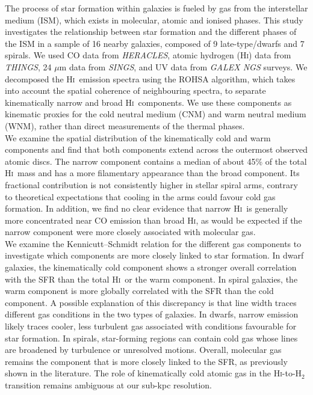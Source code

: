 \documentclass[12pt]{article}
\newcommand{\HI}{\textrm{H\textsc{i}}}
\begin{document}
The process of star formation within galaxies is fueled by gas from the interstellar medium (ISM), which exists in molecular, atomic and ionised phases. This study investigates the relationship between star formation and the different phases of the ISM in a sample of 16 nearby galaxies, composed of 9 late-type/dwarfs and 7 spirals.
We used CO data from \textit{HERACLES}, atomic hydrogen (\HI) data from \textit{THINGS}, 24 $\mu$m data from \textit{SINGS}, and UV data from \textit{GALEX NGS} surveys. We decomposed the \HI\ emission spectra using the ROHSA algorithm, which takes into account the spatial coherence of neighbouring spectra, to separate kinematically narrow and broad \HI\ components. We use these components as kinematic proxies for the cold neutral medium (CNM) and warm neutral medium (WNM), rather than direct measurements of the thermal phases.\\
We examine the spatial distribution of the kinematically cold and warm components and find that both components extend across the outermost observed atomic discs. The narrow component contains a median of about 45\% of the total \HI\ mass and has a more filamentary appearance than the broad component. Its fractional contribution is not consistently higher in stellar spiral arms, contrary to theoretical expectations that cooling in the arms could favour cold gas formation. In addition, we find no clear evidence that narrow \HI\ is generally more concentrated near CO emission than broad \HI, as would be expected if the narrow component were more closely associated with molecular gas.\\
We examine the Kennicutt--Schmidt relation for the different gas components to investigate which components are more closely linked to star formation. In dwarf galaxies, the kinematically cold component shows a stronger overall correlation with the SFR than the total \HI\ or the warm component. In spiral galaxies, the warm component is more globally correlated with the SFR than the cold component. A possible explanation of this discrepancy is that line width traces different gas conditions in the two types of galaxies. In dwarfs, narrow emission likely traces cooler, less turbulent gas associated with conditions favourable for star formation. In spirals, star-forming regions can contain cold gas whose lines are broadened by turbulence or unresolved motions. Overall, molecular gas remains the component that is more closely linked to the SFR, as previously shown in the literature. The role of kinematically cold atomic gas in the \HI-to-H$_2$ transition remains ambiguous at our sub-kpc resolution.
\end{document}

